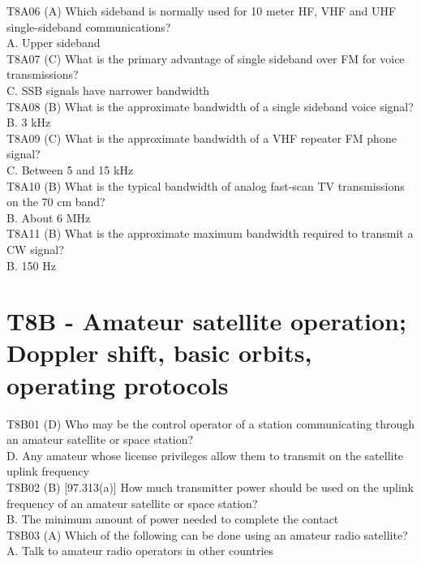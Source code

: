 \documentclass[12pt,letterpaper]{report}
\begin{document}
T8A06 (A)
Which sideband is normally used for 10 meter HF, VHF and UHF single-sideband communications?\\
A. Upper sideband\\

T8A07 (C) What is the primary advantage of single sideband over FM for voice transmissions?\\
C. SSB signals have narrower bandwidth\\

T8A08 (B) What is the approximate bandwidth of a single sideband voice signal?\\
B. 3 kHz\\

T8A09 (C)
What is the approximate bandwidth of a VHF repeater FM phone signal?\\
C. Between 5 and 15 kHz\\

T8A10 (B) What is the typical bandwidth of analog fast-scan TV transmissions on the 70 cm band?\\
B. About 6 MHz\\

T8A11 (B) What is the approximate maximum bandwidth required to transmit a CW signal?\\
B. 150 Hz\\

\section{T8B - Amateur satellite operation; Doppler shift, basic orbits, operating protocols}

T8B01 (D) Who may be the control operator of a station communicating through an amateur satellite or space station?\\
D. Any amateur whose license privileges allow them to transmit on the satellite uplink frequency\\

T8B02 (B) [97.313(a)] How much transmitter power should be used on the uplink frequency of an amateur satellite or space station?\\
B. The minimum amount of power needed to complete the contact\\

T8B03 (A) Which of the following can be done using an amateur radio satellite?\\
A. Talk to amateur radio operators in other countries\\
\end{document}
